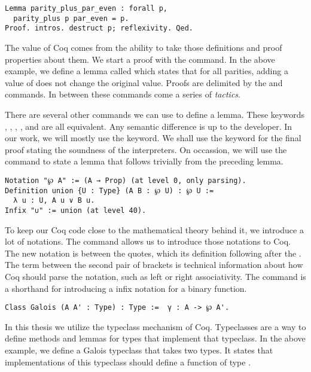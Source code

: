 \begin{verbatim}
Lemma parity_plus_par_even : forall p,
  parity_plus p par_even = p.
Proof. intros. destruct p; reflexivity. Qed.
\end{verbatim}

The value of Coq comes from the ability to take those definitions and proof
properties about them. We start a proof with the  command. In the
above example, we define a lemma called  which
states that for all parities, adding a value of  does not change
the original value. Proofs are delimited by the  and  
commands. In between these commands come a series of \emph{tactics}. 

There are several other commands we can use to define a lemma. These keywords 
, , , ,  and 
 are all equivalent. Any
semantic difference is up to the developer. In our work, we will mostly use the
 keyword. We shall use the  keyword for the final proof 
stating the soundness of the interpreters. On occassion, we will use the 
 command to state a lemma that follows trivially from the 
preceding lemma.

\begin{verbatim}
Notation "℘ A" := (A → Prop) (at level 0, only parsing).
Definition union {U : Type} (A B : ℘ U) : ℘ U :=
  λ u : U, A u ∨ B u.
Infix "∪" := union (at level 40).
\end{verbatim}

To keep our Coq code close to the mathematical theory behind it, we introduce a
lot of notations. The  command allows us to introduce those
notations to Coq. The new notation is between the quotes, which its definition
following after the \coq{:= }. The term between the second pair of brackets
is technical information about how Coq should parse the notation, such as
left or right associativity. The  command is a shorthand for
introducing a infix notation for a binary function.

\begin{verbatim}
Class Galois (A A' : Type) : Type :=  γ : A -> ℘ A'.
\end{verbatim}

In this thesis we utilize the typeclass mechanism of Coq. Typeclasses are a way
to define methods and lemmas for types that implement that typeclass. In the
above example, we define a Galois typeclass that takes two types. It states that
implementations of this typeclass should define a function  of type
.

